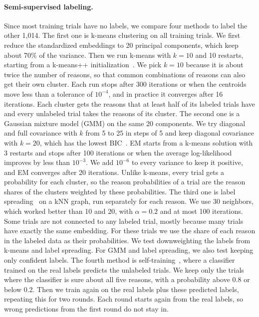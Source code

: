 \documentclass[10pt,twocolumn,letterpaper]{article}
\begin{document}
\paragraph{Semi-supervised labeling.}
Since most training trials have no labels, we compare four methods to label the other 1{,}014.
The first one is k-means clustering on all training trials.
We first reduce the standardized embeddings to 20 principal components, which keep about 70\% of the variance.
Then we run k-means with $k=10$ and 10 restarts, starting from a k-means++ initialization~\cite{arthur2007kmeans}.
We pick $k=10$ because it is about twice the number of reasons, so that common combinations of reasons can also get their own cluster.
Each run stops after 300 iterations or when the centroids move less than a tolerance of $10^{-4}$, and in practice it converges after 16 iterations.
Each cluster gets the reasons that at least half of its labeled trials have and every unlabeled trial takes the reasons of its cluster.
The second one is a Gaussian mixture model (GMM) on the same 20 components.
We try diagonal and full covariance with $k$ from 5 to 25 in steps of 5 and keep diagonal covariance with $k=20$, which has the lowest BIC~\cite{schwarz1978estimating}.
EM starts from a k-means solution with 3 restarts and stops after 100 iterations or when the average log-likelihood improves by less than $10^{-3}$.
We add $10^{-6}$ to every variance to keep it positive, and EM converges after 20 iterations.
Unlike k-means, every trial gets a probability for each cluster, so the reason probabilities of a trial are the reason shares of the clusters weighted by these probabilities.
The third one is label spreading~\cite{zhou2004learning} on a kNN graph, run separately for each reason.
We use 30 neighbors, which worked better than 10 and 20, with $\alpha=0.2$ and at most 100 iterations.
Some trials are not connected to any labeled trial, mostly because many trials have exactly the same embedding.
For these trials we use the share of each reason in the labeled data as their probabilities.
We test downweighting the labels from k-means and label spreading. For GMM and label spreading, we also test keeping only confident labels.
The fourth method is self-training~\cite{yarowsky1995unsupervised}, where a classifier trained on the real labels predicts the unlabeled trials.
We keep only the trials where the classifier is sure about all five reasons, with a probability above 0.8 or below 0.2.
Then we train again on the real labels plus these predicted labels, repeating this for two rounds.
Each round starts again from the real labels, so wrong predictions from the first round do not stay in.
\end{document}
